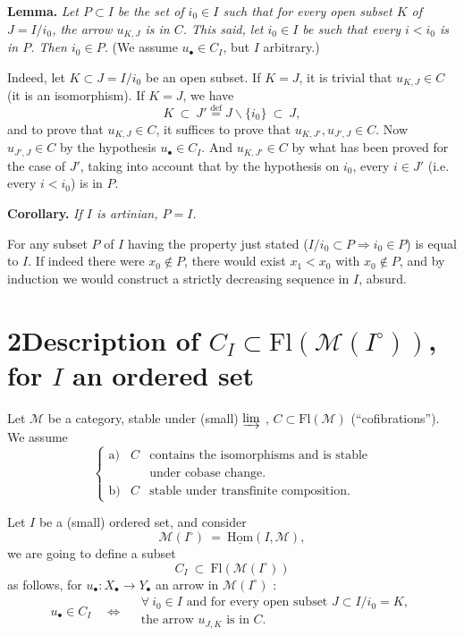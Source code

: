 \documentclass[11pt]{article}
\newcommand{\printedpage}[1]{\marginpar{\footnotesize p.~#1}}
\newcommand{\msp}[1]{\marginpar{\footnotesize [#1]}}
\newcommand{\Fl}{\mathrm{Fl}}
\newcommand{\M}{\mathcal{M}}
\begin{document}
\printedpage{14}

\msp{page 24}

\textbf{Lemma.} \textit{Let $P \subset I$ be the set of $i_0 \in I$ such that for every open subset $K$ of $J = I/i_0$, the arrow $u_{K,J}$ is in $C$. This said, let $i_0 \in I$ be such that every $i < i_0$ is in $P$. Then $i_0 \in P$.} (We assume $u_\bullet \in C_I$, but $I$ arbitrary.)

Indeed, let $K \subset J = I/i_0$ be an open subset. If $K = J$, it is trivial that $u_{K,J} \in C$ (it is an isomorphism). If $K = J$, we have %
\[
K \ \subset\ J' \overset{\text{def}}{=} J\backslash\{i_0\} \ \subset\ J,
\]
and to prove that $u_{K,J} \in C$, it suffices to prove that $u_{K,J'}, u_{J',J} \in C$. Now $u_{J',J} \in C$ by the hypothesis $u_\bullet \in C_I$. And $u_{K,J'} \in C$ by what has been proved for the case of $J'$, taking into account that by the hypothesis on $i_0$, every $i \in J'$ (i.e. every $i < i_0$) is in $P$. %

\textbf{Corollary.} \textit{If $I$ is artinian, $P = I$.}

For any subset $P$ of $I$ having the property just stated ($I/i_0 \subset P \Longrightarrow i_0 \in P$) is equal to $I$. If indeed there were $x_0 \notin P$, there would exist $x_1 < x_0$ with $x_0 \notin P$, and by induction we would construct a strictly decreasing sequence in $I$, absurd. %

\msp{page 25}

\section*{2\quad Description of $C_I \subset \Fl(\M(I^\circ))$, for $I$ an ordered set}

Let $\M$ be a category, stable under (small) $\varinjlim$ , $C \subset \Fl(\M)$ (``cofibrations''). We assume
\[
\left\{
\begin{array}{lll}
\text{a)} & C & \text{contains the isomorphisms and is stable}\\
 & & \text{under cobase change.}\\[1ex]
\text{b)} & C & \text{stable under transfinite composition.}
\end{array}
\right.
\tag*{(2.1)}
\]

Let $I$ be a (small) ordered set, and consider
\[
\M(I^\circ) \ =\ \underline{\mathrm{Hom}}(I,\M),
\]
we are going to define a subset
\[
C_I \ \subset\ \Fl(\M(I^\circ))
\]
as follows, for $u_\bullet : X_\bullet \longrightarrow Y_\bullet$ an arrow in $\M(I^\circ)$ :
\[
u_\bullet \in C_I \quad\Longleftrightarrow\quad
\begin{array}{l}
\forall\ i_0 \in I \text{ and for every open subset } J \subset I/i_0 = K,\\
\text{the arrow } u_{J,K} \text{ is in } C.
\end{array}
\tag*{(2.2)}
\]
\end{document}
